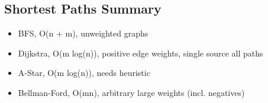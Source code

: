 \documentclass[10pt]{article}
\begin{document}
\subsection*{Shortest Paths Summary}
\begin{itemize}
	\item BFS, O(n + m), unweighted graphs
	\item Dijkstra, O(m log(n)), positive edge weights, single source all paths
	\item A-Star, O(m log(n)), needs heuristic
	\item Bellman-Ford, O(mn), arbitrary large weights (incl. negatives)
\end{itemize}
\end{document}
